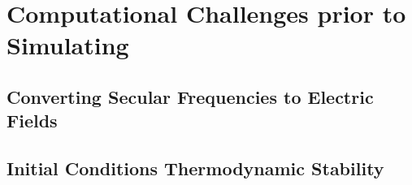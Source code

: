 \chapter{Computational Challenges prior to Simulating}\label{computational-challenges}

\section{Converting Secular Frequencies to Electric Fields}\label{converting-secular-frequencies-to-electric-fields}

\section{Initial Conditions Thermodynamic Stability}\label{initial-conditions-thermodynamic-stability}

